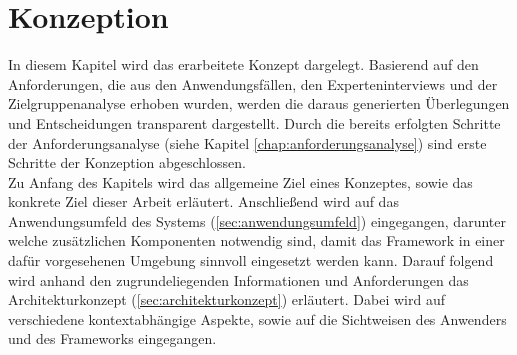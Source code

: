 \chapter{Konzeption}
\label{chap:konzept}
    In diesem Kapitel wird das erarbeitete Konzept dargelegt. Basierend auf den 
    Anforderungen, die aus den Anwendungsfällen, den Experteninterviews und der Zielgruppenanalyse 
    erhoben wurden, werden die daraus generierten Überlegungen und Entscheidungen transparent 
    dargestellt. Durch die bereits erfolgten Schritte der Anforderungsanalyse (siehe Kapitel \ref{chap:anforderungsanalyse})
    sind erste Schritte der Konzeption abgeschlossen. 
    \\
    Zu Anfang des Kapitels wird das allgemeine Ziel eines Konzeptes, sowie das konkrete Ziel dieser Arbeit 
    erläutert. Anschließend 
    wird auf das Anwendungsumfeld des Systems (\ref{sec:anwendungsumfeld}) eingegangen, darunter 
    welche zusätzlichen Komponenten notwendig sind, damit das Framework in einer dafür vorgesehenen Umgebung sinnvoll 
    eingesetzt werden kann.
    Darauf folgend wird anhand den 
    zugrundeliegenden Informationen und Anforderungen das Architekturkonzept (\ref{sec:architekturkonzept}) erläutert. %
    Dabei wird auf verschiedene kontextabhängige Aspekte, sowie auf die Sichtweisen des Anwenders und des Frameworks eingegangen.

